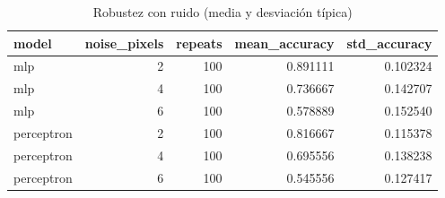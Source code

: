 \begin{table}
\caption{Robustez con ruido (media y desviación típica)}
\label{tab:noise_eval_summary}
\begin{tabular}{lrrrr}
\toprule
model & noise_pixels & repeats & mean_accuracy & std_accuracy \\
\midrule
mlp & 2 & 100 & 0.891111 & 0.102324 \\
mlp & 4 & 100 & 0.736667 & 0.142707 \\
mlp & 6 & 100 & 0.578889 & 0.152540 \\
perceptron & 2 & 100 & 0.816667 & 0.115378 \\
perceptron & 4 & 100 & 0.695556 & 0.138238 \\
perceptron & 6 & 100 & 0.545556 & 0.127417 \\
\bottomrule
\end{tabular}
\end{table}
